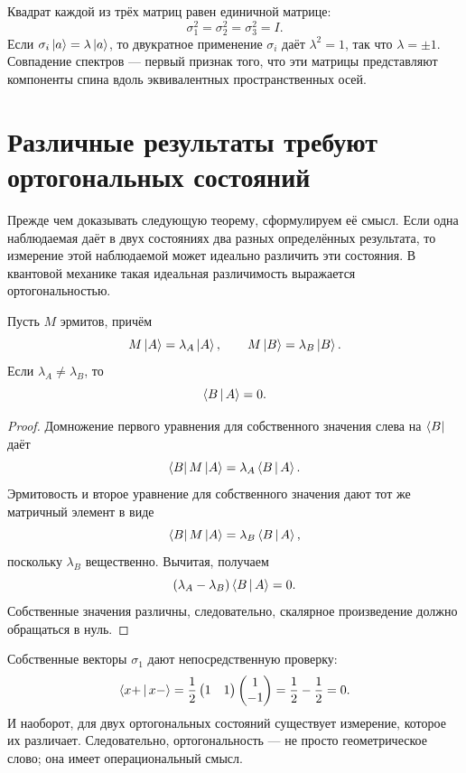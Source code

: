 Квадрат каждой из трёх матриц равен единичной матрице:
\begin{equation}
  \sigma_1^2=\sigma_2^2=\sigma_3^2=I.
  \label{eq:l03-pauli-squares}
\end{equation}
Если \(\sigma_i\left\lvert a\right\rangle=\lambda\left\lvert a\right\rangle\), то двукратное применение \(\sigma_i\) даёт \(\lambda^2=1\), так что \(\lambda=\pm1\). Совпадение спектров — первый признак того, что эти матрицы представляют компоненты спина вдоль эквивалентных пространственных осей.

\section{Различные результаты требуют ортогональных состояний}

Прежде чем доказывать следующую теорему, сформулируем её смысл. Если одна наблюдаемая даёт в двух состояниях два разных определённых результата, то измерение этой наблюдаемой может идеально различить эти состояния. В квантовой механике такая идеальная различимость выражается ортогональностью.

\begin{theorem}
Пусть \(M\) эрмитов, причём
\begin{equation}
  M\left\lvert A\right\rangle=\lambda_A\left\lvert A\right\rangle,
  \qquad
  M\left\lvert B\right\rangle=\lambda_B\left\lvert B\right\rangle.
\end{equation}
Если \(\lambda_A\ne\lambda_B\), то
\begin{equation}
  \left\langle B\,\middle|\,A\right\rangle=0.
\end{equation}
\end{theorem}

\begin{proof}
Домножение первого уравнения для собственного значения слева на \(\left\langle B\right\rvert\) даёт
\begin{equation}
  \left\langle B\right\rvert M\left\lvert A\right\rangle=\lambda_A\left\langle B\,\middle|\,A\right\rangle.
\end{equation}
Эрмитовость и второе уравнение для собственного значения дают тот же матричный элемент в виде
\begin{equation}
  \left\langle B\right\rvert M\left\lvert A\right\rangle=\lambda_B\left\langle B\,\middle|\,A\right\rangle,
\end{equation}
поскольку \(\lambda_B\) вещественно. Вычитая, получаем
\begin{equation}
  (\lambda_A-\lambda_B)\left\langle B\,\middle|\,A\right\rangle=0.
\end{equation}
Собственные значения различны, следовательно, скалярное произведение должно обращаться в нуль.
\end{proof}

Собственные векторы \(\sigma_1\) дают непосредственную проверку:
\begin{equation}
  \left\langle x+\,\middle|\,x-\right\rangle
  =
  \frac12
  \begin{pmatrix}1&1\end{pmatrix}
  \begin{pmatrix}1\\-1\end{pmatrix}
  =\frac12-\frac12=0.
\end{equation}
И наоборот, для двух ортогональных состояний существует измерение, которое их различает. Следовательно, ортогональность — не просто геометрическое слово; она имеет операциональный смысл.

